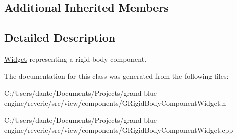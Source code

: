 \subsection*{Additional Inherited Members}


\subsection{Detailed Description}
\mbox{\hyperlink{class_widget}{Widget}} representing a rigid body component. 

The documentation for this class was generated from the following files\+:\begin{DoxyCompactItemize}
\item 
C\+:/\+Users/dante/\+Documents/\+Projects/grand-\/blue-\/engine/reverie/src/view/components/G\+Rigid\+Body\+Component\+Widget.\+h\item 
C\+:/\+Users/dante/\+Documents/\+Projects/grand-\/blue-\/engine/reverie/src/view/components/G\+Rigid\+Body\+Component\+Widget.\+cpp\end{DoxyCompactItemize}
